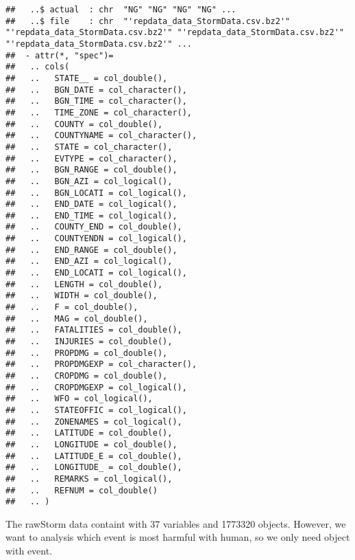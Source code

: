 \documentclass[
]{article}
\newenvironment{Shaded}{\begin{snugshade}}{\end{snugshade}}
\newcommand{\KeywordTok}[1]{\textcolor[rgb]{0.13,0.29,0.53}{\textbf{#1}}}
\newcommand{\NormalTok}[1]{#1}
\newcommand{\OperatorTok}[1]{\textcolor[rgb]{0.81,0.36,0.00}{\textbf{#1}}}
\newcommand{\StringTok}[1]{\textcolor[rgb]{0.31,0.60,0.02}{#1}}
\begin{document}
\begin{verbatim}
##   ..$ actual  : chr  "NG" "NG" "NG" "NG" ...
##   ..$ file    : chr  "'repdata_data_StormData.csv.bz2'" "'repdata_data_StormData.csv.bz2'" "'repdata_data_StormData.csv.bz2'" "'repdata_data_StormData.csv.bz2'" ...
##  - attr(*, "spec")=
##   .. cols(
##   ..   STATE__ = col_double(),
##   ..   BGN_DATE = col_character(),
##   ..   BGN_TIME = col_character(),
##   ..   TIME_ZONE = col_character(),
##   ..   COUNTY = col_double(),
##   ..   COUNTYNAME = col_character(),
##   ..   STATE = col_character(),
##   ..   EVTYPE = col_character(),
##   ..   BGN_RANGE = col_double(),
##   ..   BGN_AZI = col_logical(),
##   ..   BGN_LOCATI = col_logical(),
##   ..   END_DATE = col_logical(),
##   ..   END_TIME = col_logical(),
##   ..   COUNTY_END = col_double(),
##   ..   COUNTYENDN = col_logical(),
##   ..   END_RANGE = col_double(),
##   ..   END_AZI = col_logical(),
##   ..   END_LOCATI = col_logical(),
##   ..   LENGTH = col_double(),
##   ..   WIDTH = col_double(),
##   ..   F = col_double(),
##   ..   MAG = col_double(),
##   ..   FATALITIES = col_double(),
##   ..   INJURIES = col_double(),
##   ..   PROPDMG = col_double(),
##   ..   PROPDMGEXP = col_character(),
##   ..   CROPDMG = col_double(),
##   ..   CROPDMGEXP = col_logical(),
##   ..   WFO = col_logical(),
##   ..   STATEOFFIC = col_logical(),
##   ..   ZONENAMES = col_logical(),
##   ..   LATITUDE = col_double(),
##   ..   LONGITUDE = col_double(),
##   ..   LATITUDE_E = col_double(),
##   ..   LONGITUDE_ = col_double(),
##   ..   REMARKS = col_logical(),
##   ..   REFNUM = col_double()
##   .. )
\end{verbatim}

The rawStorm data containt with 37 variables and 1773320 objects.
However, we want to analysis which event is most harmful with human, so
we only need object with event.

\begin{Shaded}
\end{Shaded}
\end{document}

